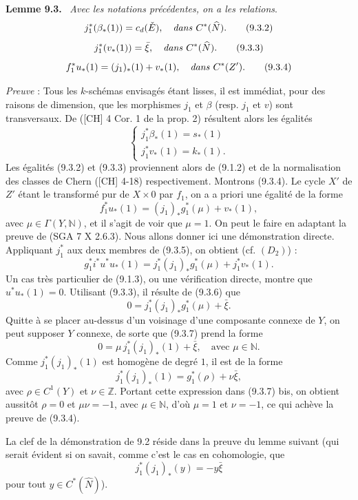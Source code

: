 \documentclass[11pt]{article}
\newenvironment{statement}[1]{\par\medskip\noindent\textbf{#1.}\ }{\par\medskip}
\begin{document}
\begin{statement}{Lemme 9.3}
\emph{Avec les notations précédentes, on a les relations}.
\[
j_1^*(\beta_*(1))=c_d(\check E),\quad\text{\emph{dans} }C^*(\widehat N).
\tag{9.3.2}
\]
\[
j_1^*(v_*(1))=\bar\xi,\quad\text{\emph{dans} }C^*(\widehat N).
\tag{9.3.3}
\]
\[
f_1^*u_*(1)=(j_1)_*(1)+v_*(1),\quad\text{\emph{dans} }C^*(Z').
\tag{9.3.4}
\]
\end{statement}

\emph{Preuve} : Tous les $k$-schémas envisagés étant lisses, il est immédiat, pour des raisons de dimension, que les morphismes $j_1$ et $\beta$ (resp. $j_1$ et $v$) sont transversaux. De ([CH] 4 Cor. 1 de la prop. 2) résultent alors les égalités
\[
\begin{cases}
j_1^*\beta_*(1)=s_*(1)\\
j_1^*v_*(1)=k_*(1).
\end{cases}
\]
Les égalités (9.3.2) et (9.3.3) proviennent alors de (9.1.2) et de la normalisation des classes de Chern ([CH] 4-18) respectivement. Montrons (9.3.4). Le cycle $X'$ de $Z'$ étant le transformé pur de $X\times0$ par $f_1$, on a a priori une égalité de la forme
\[
f_1^*u_*(1)=(j_1)_*g_1^*(\mu)+v_*(1),
\tag{9.3.5}
\]
avec $\mu\in\Gamma(Y,\mathbb N)$, et il s'agit de voir que $\mu=1$. On peut le faire en adaptant la preuve de (SGA 7 X 2.6.3). Nous allons donner ici une démonstration directe. Appliquant $j_1^*$ aux deux membres de (9.3.5), on obtient (cf. $(D_2)$) :
\[
g_1^*i^*u^*u_*(1)=j_1^*(j_1)_*g_1^*(\mu)+j_1^*v_*(1).
\tag{9.3.6}
\]
Un cas très particulier de (9.1.3), ou une vérification directe, montre que $u^*u_*(1)=0$. Utilisant (9.3.3), il résulte de (9.3.6) que
\[
0=j_1^*(j_1)_*g_1^*(\mu)+\bar\xi.
\tag{9.3.7}
\]
Quitte à se placer au-dessus d'un voisinage d'une composante connexe de $Y$, on peut supposer $Y$ connexe, de sorte que (9.3.7) prend la forme
\[
0=\mu\,j_1^*(j_1)_*(1)+\bar\xi,\quad\text{avec }\mu\in\mathbb N.
\tag*{(9.3.7) bis}
\]
Comme $j_1^*(j_1)_*(1)$ est homogène de degré $1$, il est de la forme
\[
j_1^*(j_1)_*(1)=g_1^*(\rho)+\nu\bar\xi,
\]
avec $\rho\in C^1(Y)$ et $\nu\in\mathbb Z$. Portant cette expression dans (9.3.7) bis, on obtient aussitôt $\rho=0$ et $\mu\nu=-1$, avec $\mu\in\mathbb N$, d'où $\mu=1$ et $\nu=-1$, ce qui achève la preuve de (9.3.4).

La clef de la démonstration de 9.2 réside dans la preuve du lemme suivant (qui serait évident si on savait, comme c'est le cas en cohomologie, que
\[
j_1^*(j_1)_*(y)=-y\bar\xi
\]
pour tout $y\in C^*(\widehat N)$).
\end{document}
